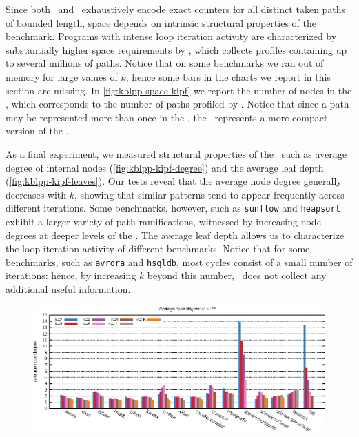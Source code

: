 \noindent Since both \blpp\ and \kblpp\ exhaustively encode exact counters for all distinct taken paths of bounded length, space depends on intrinsic structural properties of the benchmark. Programs with intense loop iteration activity are characterized by substantially higher space requirements by \kblpp, which collects profiles containing up to several millions of paths. Notice that on some benchmarks we ran out of memory for large values of $k$, hence some bars in the charts we report in this section are missing. In \myfigure\ref{fig:kblpp-space-kipf} we report the number of nodes in the \kipf, which corresponds to the number of paths profiled by \kblpp. Notice that since a path may be represented more than once in the \ksf, the \kipf\ represents a more compact version of the \ksf.

\noindent As a final experiment, we measured structural properties of the \kipf\ such as average degree of internal nodes (\myfigure\ref{fig:kblpp-kipf-degree}) and the average leaf depth (\myfigure\ref{fig:kblpp-kipf-leaves}). Our tests reveal that the average node degree generally decreases with $k$, showing that similar patterns tend to appear frequently across different iterations. Some benchmarks, however, such as {\tt sunflow} and {\tt heapsort} exhibit a larger variety of path ramifications, witnessed by increasing node degrees at deeper levels of the \kipf. The average leaf depth allows us to characterize the loop iteration activity of different benchmarks. Notice that for some benchmarks, such as {\tt avrora} and {\tt hsqldb}, most cycles consist of a small number of iterations: hence, by increasing $k$ beyond this number, \kblpp\ does not collect any additional useful information.

\ifdefined\noauthorea
\begin{figure}[!ht]
\begin{center}
\includegraphics[width=\textwidth]{figures/kblpp-kipf-degree/kblpp-kipf-degree.eps}
\caption{\protect}
\end{center}
\end{figure}
\fi

